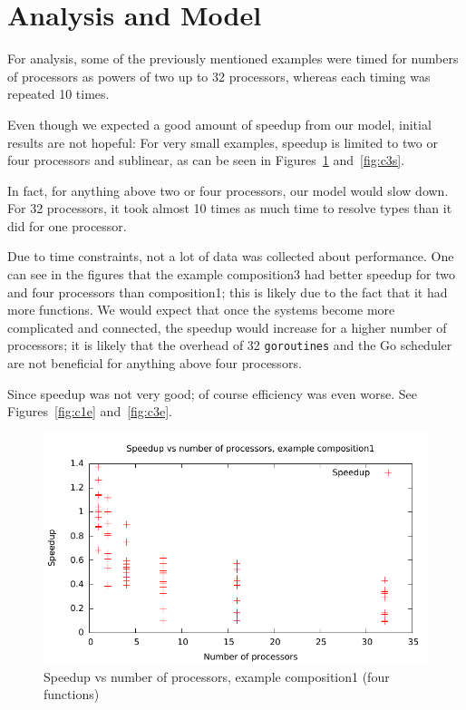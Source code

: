 \documentclass{acm_proc_article-sp}
\begin{document}
\section{Analysis and Model}

For analysis, some of the previously mentioned examples were timed for numbers
of processors as powers of two up to 32 processors, whereas each timing was
repeated 10 times.

Even though we expected a good amount of speedup from our model, initial
results are not hopeful: For very small examples, speedup is limited to two or
four processors and sublinear, as can be seen in Figures~\ref{fig:c1s}
and~\ref{fig:c3s}. 

In fact, for anything above two or four processors, our model would slow down.
For 32 processors, it took almost 10 times as much time to resolve types than
it did for one processor.

Due to time constraints, not a lot of data was collected about performance. One
can see in the figures that the example composition3 had better speedup for two
and four processors than composition1; this is likely due to the fact that it
had more functions. We would expect that once the systems become more
complicated and connected, the speedup would increase for a higher number of
processors; it is likely that the overhead of 32 \texttt{goroutines} and the Go
scheduler are not beneficial for anything above four processors.

Since speedup was not very good; of course efficiency was even worse. See
Figures~\ref{fig:c1e} and~\ref{fig:c3e}.

\begin{figure}[ht] 
	\centering
	\includegraphics[scale=0.6]{../../data/composite1-speedup.pdf}
	\caption{Speedup vs number of processors, example composition1 (four
	functions)} 
	\label{fig:c1s} 
\end{figure} 
\end{document}
